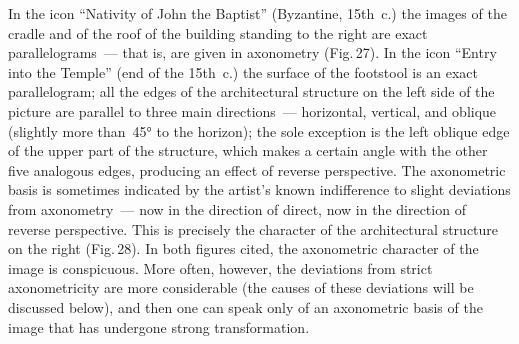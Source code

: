 In the icon ``Nativity of John the Baptist'' (Byzantine, 15th~c.) the images of the
cradle and of the roof of the building standing to the right are exact parallelograms~---
that is, are given in axonometry (Fig.\,27).  In the icon ``Entry into the Temple'' (end
of the 15th~c.) the surface of the footstool is an exact parallelogram; all the edges of
the architectural structure on the left side of the picture are parallel to three main
directions~--- horizontal, vertical, and oblique (slightly more than~45° to the horizon);
the sole exception is the left oblique edge of the upper part of the structure, which
makes a certain angle with the other five analogous edges, producing an effect of
reverse perspective.  The axonometric basis is sometimes indicated by the artist's
known indifference to slight deviations from axonometry~--- now in the direction of
direct, now in the direction of reverse perspective.  This is precisely the character of
the architectural structure on the right (Fig.\,28).  In both figures cited, the axonometric
character of the image is conspicuous.  More often, however, the deviations from strict
axonometricity are more considerable (the causes of these deviations will be discussed
below), and then one can speak only of an axonometric basis of the image that has
undergone strong transformation.




